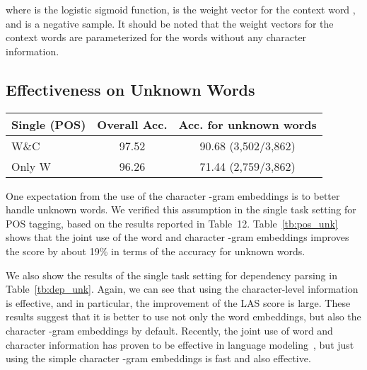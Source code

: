 \documentclass[11pt,a4paper]{article}
\begin{document}
where  is the logistic sigmoid function,  is the weight vector for the context word , and  is a negative sample.
It should be noted that the weight vectors for the context words are parameterized for the words without any character information.


\subsection{Effectiveness on Unknown Words}
\begin{table*}[t]
  \begin{center}
\begin{tabular}{l|c|c}
  	Single (POS) & Overall Acc. & Acc. for unknown words \\ \hline
    W\&C         & 97.52 & 90.68 (3,502/3,862) \\ \hline
    Only W       & 96.26 & 71.44 (2,759/3,862) \\ \hline
  \end{tabular}
\caption{POS tagging scores on the development set with and without the character -gram embeddings, focusing on accuracy for unknown words.
    	     The overall accuracy scores are taken from Table~12.
             There are 3,862 unknown words in the sentences of the development set.}
    \label{tb:pos_unk}
  \end{center}
\end{table*}

One expectation from the use of the character -gram embeddings is to better handle unknown words.
We verified this assumption in the single task setting for POS tagging, based on the results reported in Table~12.
Table~\ref{tb:pos_unk} shows that the joint use of the word and character -gram embeddings improves the score by about 19\% in terms of the accuracy for unknown words.

We also show the results of the single task setting for dependency parsing in Table~\ref{tb:dep_unk}.
Again, we can see that using the character-level information is effective, and in particular, the improvement of the LAS score is large.
These results suggest that it is better to use not only the word embeddings, but also the character -gram embeddings by default.
Recently, the joint use of word and character information has proven to be effective in language modeling~\citep{miyamoto2016char}, but just using the simple character -gram embeddings is fast and also effective.
\end{document}
